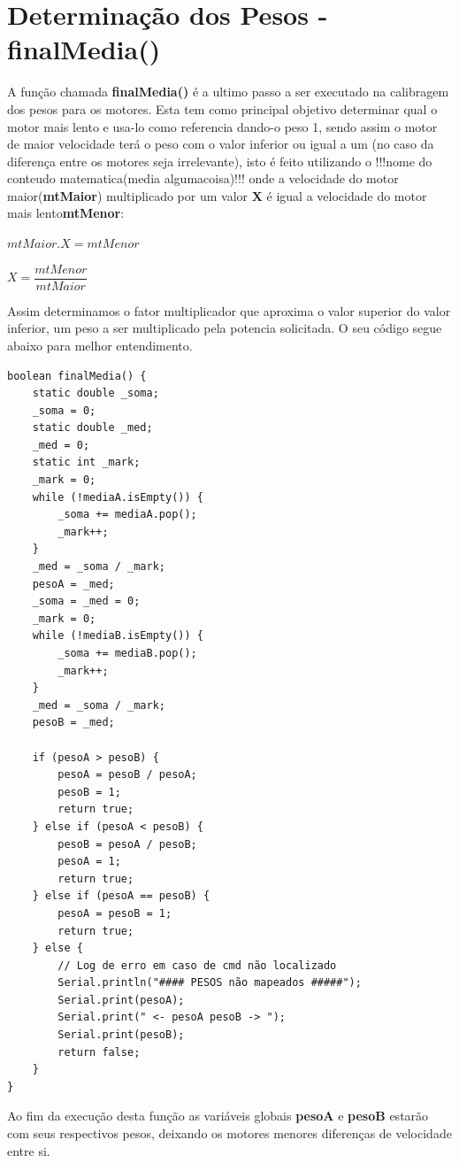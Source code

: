 \documentclass[a4paper,12pt,portuguese]{ufms-cpcx}
\begin{document}
\section{Determinação dos Pesos - finalMedia()}\label{finalMedia}
A função chamada \textbf{finalMedia()} é a ultimo passo a ser executado na calibragem dos pesos para os motores. Esta tem como principal objetivo determinar qual o motor mais lento e usa-lo como referencia dando-o peso 1, sendo assim o motor de maior velocidade terá o peso com o valor inferior ou igual a um (no caso da diferença entre os motores seja irrelevante), isto é feito utilizando o !!!nome do conteudo matematica(media algumacoisa)!!! onde a velocidade do motor maior(\textbf{mtMaior}) multiplicado por um valor \textbf{X} é igual a velocidade do motor mais lento\textbf{mtMenor}:

$ mtMaior . X = mtMenor$

$X = \dfrac{mtMenor}{mtMaior}$

Assim determinamos o fator multiplicador que aproxima o valor superior do valor inferior, um peso a ser multiplicado pela potencia solicitada. O seu código segue abaixo para melhor entendimento.
\begin{lstlisting}
boolean finalMedia() {
	static double _soma;
	_soma = 0;
	static double _med;
	_med = 0;
	static int _mark;
	_mark = 0;
	while (!mediaA.isEmpty()) {
		_soma += mediaA.pop();
		_mark++;
	}
	_med = _soma / _mark;
	pesoA = _med;	
	_soma = _med = 0;
	_mark = 0;
	while (!mediaB.isEmpty()) {
		_soma += mediaB.pop();
		_mark++;
	}
	_med = _soma / _mark;
	pesoB = _med;
	
	if (pesoA > pesoB) {
		pesoA = pesoB / pesoA;
		pesoB = 1;
		return true;
	} else if (pesoA < pesoB) {
		pesoB = pesoA / pesoB;
		pesoA = 1;
		return true;
	} else if (pesoA == pesoB) {
		pesoA = pesoB = 1;
		return true;
	} else {
		// Log de erro em caso de cmd não localizado
		Serial.println("#### PESOS não mapeados #####");
		Serial.print(pesoA);
		Serial.print(" <- pesoA pesoB -> ");
		Serial.print(pesoB);
		return false;
	}
}	
\end{lstlisting}
Ao fim da execução desta função as variáveis globais \textbf{pesoA} e \textbf{pesoB} estarão com seus respectivos pesos, deixando os motores menores diferenças de velocidade entre si.
\end{document}
